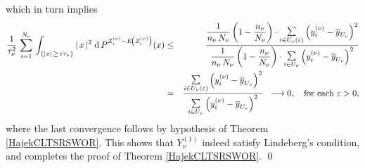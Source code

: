 which in turn implies
\begin{eqnarray*}
\dfrac{1}{\tau^{2}_{\nu}}\,
\sum_{i=1}^{N_{\nu}}\,
\int_{\left\{\vert x\vert \,\geq\, \varepsilon\tau_{\nu}\right\}}
\vert\,x\,\vert^{2}\;
\textnormal{d}\,P^{Z^{(\nu)}_{i} - E\!\left(Z^{(\nu)}_{i}\right)}(x)
& \leq &
\dfrac{
\dfrac{1}{n_{\nu}\,N_{\nu}}
\left(1- \dfrac{n_{\nu}}{N_{\nu}}\right)
\cdot\underset{i\in U_{\nu}(\varepsilon)}{\textnormal{\Large$\sum$}}\left(y^{(\nu)}_{i}-\overline{y}_{U_{\nu}}\right)^{2}
}{
\dfrac{1}{n_{\nu}\,N_{\nu}}
\left(1- \dfrac{n_{\nu}}{N_{\nu}}\right)
\cdot\underset{i\in U_{\nu}}{\textnormal{\Large$\sum$}}\left(y^{(\nu)}_{i}-\overline{y}_{U_{\nu}}\right)^{2}
}
\\
& = &
\dfrac{
\underset{i\in U_{\nu}(\varepsilon)}{\textnormal{\Large$\sum$}}\left(y^{(\nu)}_{i}-\overline{y}_{U_{\nu}}\right)^{2}
}{
\underset{i\in U_{\nu}}{\textnormal{\Large$\sum$}}\left(y^{(\nu)}_{i}-\overline{y}_{U_{\nu}}\right)^{2}
}
\;\;\longrightarrow 0,
\quad
\textnormal{for each $\varepsilon > 0$},
\end{eqnarray*}
where the last convergence follows by hypothesis of Theorem \ref{HajekCLTSRSWOR}.
This shows that $Y^{(1)}_{\nu}$ indeed satisfy Lindeberg's condition, and completes the proof of
Theorem \ref{HajekCLTSRSWOR}.
\qed

